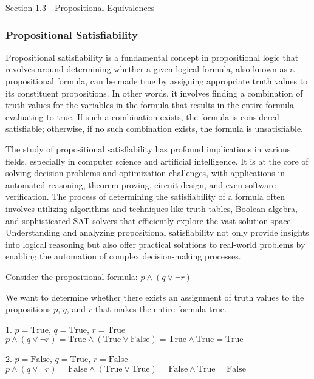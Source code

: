 \begin{notes}{Section 1.3 - Propositional Equivalences}
    \subsubsection*{Propositional Satisfiability}

    Propositional satisfiability is a fundamental concept in propositional logic that revolves around determining whether a given logical formula, also known as a propositional formula, can be made true by assigning appropriate 
    truth values to its constituent propositions. In other words, it involves finding a combination of truth values for the variables in the formula that results in the entire formula evaluating to true. If such a combination 
    exists, the formula is considered satisfiable; otherwise, if no such combination exists, the formula is unsatisfiable.

    The study of propositional satisfiability has profound implications in various fields, especially in computer science and artificial intelligence. It is at the core of solving decision problems and optimization challenges, 
    with applications in automated reasoning, theorem proving, circuit design, and even software verification. The process of determining the satisfiability of a formula often involves utilizing algorithms and techniques like 
    truth tables, Boolean algebra, and sophisticated SAT solvers that efficiently explore the vast solution space. Understanding and analyzing propositional satisfiability not only provide insights into logical reasoning but 
    also offer practical solutions to real-world problems by enabling the automation of complex decision-making processes.

    \begin{Highlight}
        Consider the propositional formula: \(p \land (q \lor \neg r)\) \vspace*{1em}

        We want to determine whether there exists an assignment of truth values to the propositions \(p\), \(q\), and \(r\) that makes the entire formula true.
    

        1. \(p = \text{True}\), \(q = \text{True}\), \(r = \text{True}\)
        \(p \land (q \lor \neg r) = \text{True} \land (\text{True} \lor \text{False}) = \text{True} \land \text{True} = \text{True}\)
    
        2. \(p = \text{False}\), \(q = \text{True}\), \(r = \text{False}\)
        \(p \land (q \lor \neg r) = \text{False} \land (\text{True} \lor \text{True}) = \text{False} \land \text{True} = \text{False}\)
    

\end{Highlight}
\end{notes}
